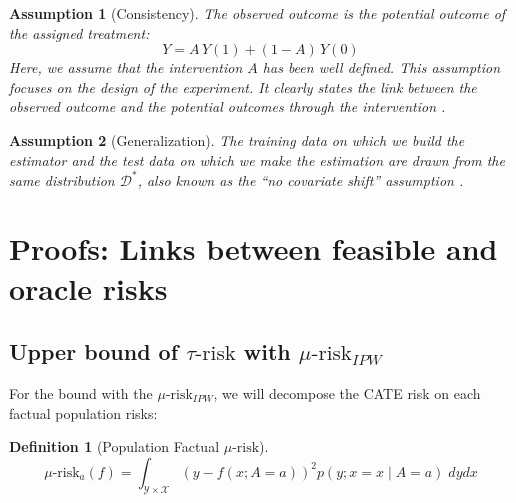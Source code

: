 \documentclass{report}
\newtheorem{assumption}{Assumption}
\newtheorem{definition}{Definition}
\begin{document}
\begin{appendices}

  \begin{assumption}[Consistency]\label{assumption:consistency} The observed
    outcome is the potential outcome of the assigned treatment:
    \begin{equation*}\label{eq:consistancy}
      Y = A \, Y(1) + (1-A) \, Y(0)
    \end{equation*}
    Here, we assume that the intervention $A$ has been well defined. This
    assumption focuses on the design of the experiment. It clearly states the link
    between the observed outcome and the potential outcomes through the
    intervention \citep{hernan_causal_2020}.
  \end{assumption}

  \begin{assumption}[Generalization]\label{assumption:generalization} The training
    data on which we build the estimator and the test data on which we make the
    estimation are drawn from the same distribution $\mathcal D^*$, also known as
    the ``no covariate shift'' assumption \citep{jesson_identifying_2020}.
  \end{assumption}

  \section{Proofs: Links between feasible and oracle risks}\label{apd:proofs}

  \subsection{Upper bound of $\tau\text{-risk}$ with
    $\mu\text{-risk}_{IPW}$}%
  \label{apd:proofs:mu_risk_ipw_bound}%

  For the bound with the $\mu\text{-risk}_{IPW}$, we will decompose the CATE risk
  on each factual population risks:

  \begin{definition}[Population Factual $\mu\text{-risk}$]\label{mu_risk_a}
    \citep{shalit_estimating_2017}
    \begin{equation*}
      \mu\text{-risk}_{a}(f)= \int_{\mathcal Y \times \mathcal X} (y-f(x ; A=a))^{2}  p(y ; x=x \mid A=a) \; dy dx
    \end{equation*}
  \end{definition}


\end{appendices}
\end{document}
